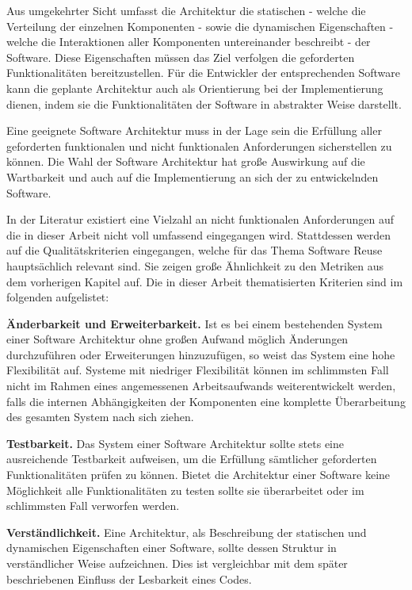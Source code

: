 \documentclass[utf8,biblatex]{lni}
\begin{document}
Aus umgekehrter Sicht umfasst die Architektur die statischen - welche die Verteilung der einzelnen Komponenten - sowie die dynamischen Eigenschaften - welche die Interaktionen aller Komponenten untereinander beschreibt - der Software. Diese Eigenschaften müssen das Ziel verfolgen die geforderten Funktionalitäten bereitzustellen. Für die Entwickler der entsprechenden Software kann die geplante Architektur auch als Orientierung bei der Implementierung dienen, indem sie die Funktionalitäten der Software in abstrakter Weise darstellt.


Eine geeignete Software Architektur muss in der Lage sein die Erfüllung aller geforderten funktionalen und nicht funktionalen Anforderungen sicherstellen zu können. Die Wahl der Software Architektur hat große Auswirkung auf die Wartbarkeit und auch auf die Implementierung an sich der zu entwickelnden Software.

In der Literatur existiert eine Vielzahl an nicht funktionalen Anforderungen auf die in dieser Arbeit nicht voll umfassend eingegangen wird. Stattdessen werden auf die Qualitätskriterien eingegangen, welche für das Thema Software Reuse hauptsächlich relevant sind. Sie zeigen große Ähnlichkeit zu den Metriken aus dem vorherigen Kapitel auf. Die in dieser Arbeit thematisierten Kriterien sind im folgenden aufgelistet:

\textbf{Änderbarkeit und Erweiterbarkeit.} Ist es bei einem bestehenden System einer Software Architektur ohne großen Aufwand möglich Änderungen durchzuführen oder Erweiterungen hinzuzufügen, so weist das System eine hohe Flexibilität auf. Systeme mit niedriger Flexibilität können im schlimmsten Fall nicht im Rahmen eines angemessenen Arbeitsaufwands weiterentwickelt werden, falls die internen Abhängigkeiten der Komponenten eine komplette Überarbeitung des gesamten System nach sich ziehen.

\textbf{Testbarkeit.} Das System einer Software Architektur sollte stets eine ausreichende Testbarkeit aufweisen, um die Erfüllung sämtlicher geforderten Funktionalitäten prüfen zu können. Bietet die Architektur einer Software keine Möglichkeit alle Funktionalitäten zu testen sollte sie überarbeitet oder im schlimmsten Fall verworfen werden.

\textbf{Verständlichkeit.} Eine Architektur, als Beschreibung der statischen und dynamischen Eigenschaften einer Software, sollte dessen Struktur in verständlicher Weise aufzeichnen. Dies ist vergleichbar mit dem später beschriebenen Einfluss der Lesbarkeit eines Codes.
\end{document}

